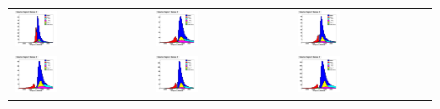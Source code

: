 {\begin{figure}[h!]
\centering
\begin{tabular}{l  l  l}
  \includegraphics[width=0.33\textwidth]{plots/mc_breakdown_comp_0_bin_0_att_0} 
  &\includegraphics[width=0.33\textwidth]{plots/mc_breakdown_comp_0_bin_1_att_0}  
  &\includegraphics[width=0.33\textwidth]{plots/mc_breakdown_comp_0_bin_2_att_0} \\
  \includegraphics[width=0.33\textwidth]{plots/mc_breakdown_comp_0_bin_3_att_0} 
  &\includegraphics[width=0.33\textwidth]{plots/mc_breakdown_comp_0_bin_4_att_0} 
  &\includegraphics[width=0.33\textwidth]{plots/mc_breakdown_comp_0_bin_5_att_0}  

\end{tabular}
\end{figure}}

